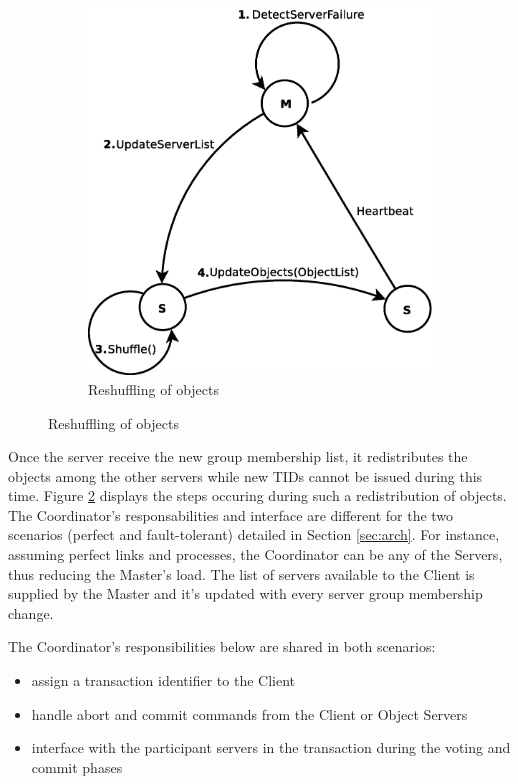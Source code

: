 \documentclass[times, 10pt,twocolumn]{article}
\begin{document}
\begin{figure}
    \begin{subfigure}[b]{0.3\textwidth}
        \includegraphics[scale=0.2]{reshuffle.eps}
        \caption{Reshuffling of objects}
        \label{fig:resh}
    \end{subfigure}
\end{figure}

Once the server receive the new group membership list, it redistributes the objects among the other servers while
 new TIDs cannot be issued during this time. Figure \ref{fig:resh} displays the steps occuring during such a
redistribution of objects.
\label{subsec:respon}
The Coordinator's responsabilities and interface are different for the two scenarios (perfect and fault-tolerant) detailed in Section \ref{sec:arch}. For instance, assuming perfect links and processes, the Coordinator can be any of the Servers, thus reducing the Master's load. The list of servers available to the Client is supplied by the Master and it's updated with every server group membership change.

The Coordinator's responsibilities below are shared in both scenarios:
\begin{itemize}[noitemsep,nolistsep]
\item assign a transaction identifier to the Client 
\item handle abort and commit commands from the Client or Object Servers 
\item interface with the participant servers in the transaction during the voting and commit phases 
\end{itemize}
\end{document}
